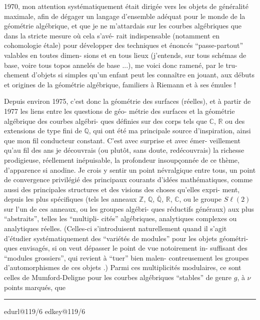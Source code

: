 \documentclass[11pt,a4paper]{article}
\makeatletter
\newif\ifreading
\newif\ifenglish
\def\CurrentScanURL{}
\def\CurrentPageKey{}
\def\CurrentApparatus{}
\newcommand{\scanpage}[1]{%
  \clearpage
  \expandafter\let\expandafter\CurrentScanURL\csname edurl@#1\endcsname
  \expandafter\let\expandafter\CurrentPageKey\csname edkey@#1\endcsname
  \def\CurrentApparatus{}%
  \hypertarget{scan-\CurrentPageKey}{}%
  \typeout{EDITION-SCAN: \CurrentPageKey; PDFPAGE: \the\numexpr\ReadonlyShipoutCounter+1\relax}%
  \ifreading
    \marginnote{\raggedright\scriptsize\sffamily\href{\CurrentScanURL}{119 / \csname edpage@#1\endcsname}}%
  \else
    \noindent{\small\sffamily\href{\CurrentScanURL}{[scan #1]}}\par\smallskip
  \fi}
\newcommand{\mspage}[1]{%
  \ifreading\marginnote{\raggedright\scriptsize\sffamily p.\,#1}[2\baselineskip]%
  \else\noindent{\small\sffamily[p.\,#1]}\par\smallskip\fi}
\newcommand{\margin}[1]{%
  \sbox{\MarginalTestBox}{\parbox{\marginparwidth}{\raggedright\footnotesize#1}}%
  \ifdim\dimexpr\ht\MarginalTestBox+\dp\MarginalTestBox\relax>3\baselineskip
    \par\smallskip\noindent\begin{minipage}{\linewidth}\hrule\smallskip
    {\footnotesize\textcolor{HandInk}{\ifenglish Marginal note:\else Note marginale :\fi\ #1}}\smallskip\hrule\end{minipage}\par\smallskip
  \else
    \marginnote{\raggedright\footnotesize\textcolor{HandInk}{#1}}%
  \fi}
\newcommand{\finishscan}{\ifx\CurrentApparatus\empty\else\par\bigskip\noindent\rule{.35\linewidth}{.35pt}\par\smallskip{\footnotesize\setlength{\parskip}{3pt}\CurrentApparatus}\fi}
\makeatother
\begin{document}
1970, mon attention systématiquement était dirigée vers les objets
de généralité maximale, afin de dégager un langage d'ensemble adéquat
pour le monde de la géométrie algébrique, et que je ne m'attardais
sur les courbes algébriques que dans la stricte mesure où cela s'avé-%
rait indispensable (notamment en cohomologie étale) pour développer
des techniques et énoncés ``passe-partout'' valables en toutes dimen-%
sions et en tous lieux (j'entends, sur tous schémas de base, voire
tous topos annelés de base ...), me voici donc ramené, par le tru-%
chement d'objets si simples qu'un enfant peut les connaître en jouant,
aux débuts et origines de la géométrie algébrique, familiers à Riemann
et à ses émules !

Depuis environ 1975, c'est donc la géométrie des surfaces
(réelles), et à partir de 1977 les liens entre les questions de géo-%
métrie des surfaces et la géométrie algébrique des courbes algébri-%
ques définies sur des corps tels que $\mathbb{C}$, $\mathbb{R}$ ou des extensions de type
fini de $\mathbb{Q}$, qui ont été ma principale source d'inspiration, ainsi
que mon fil conducteur constant. C'est avec surprise et avec émer-%
veillement qu'au fil des ans je découvrais (ou plutôt, sans doute,
redécouvrais) la richesse prodigieuse, réellement inépuisable, la
profondeur insoupçonnée de ce thème, d'apparence si anodine. Je crois
y sentir un point névralgique entre tous, un point de convergence
privilégié des principaux courants d'idées mathématiques, comme aussi
des principales structures et des visions des choses qu'elles expri-%
ment, depuis les plus spécifiques (tels les anneaux $\mathbb{Z}$, $\mathbb{Q}$, $\bar{\mathbb{Q}}$, $\mathbb{R}$, $\mathbb{C}$,
ou le groupe $S\ell(2)$ sur l'un de ces anneaux, ou les groupes algébri-%
ques réductifs généraux) aux plus ``abstraits'', telles les ``multipli-%
cités'' algébriques, analytiques complexes ou analytiques réelles.
(Celles-ci s'introduisent naturellement quand il s'agit d'étudier
systématiquement des ``variétés de modules'' pour les objets géométri-%
ques envisagés, si on veut dépasser le point de vue notoirement in-%
suffisant des ``modules grossiers'', qui revient à ``tuer'' bien malen-%
contreusement les groupes d'automorphismes de ces objets .) Parmi ces
multiplicités modulaires, ce sont celles de Mumford-Deligne pour les
courbes algébriques ``stables'' de genre $g$, à $\nu$ points marqués, que

\margin{5}

\finishscan
\scanpage{119/6}
\mspage{4}
\end{document}
